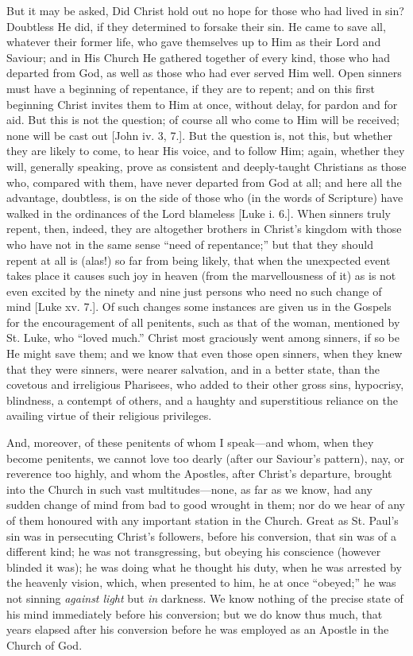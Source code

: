 But it may be asked, Did Christ hold out no hope for those who had
lived in sin? Doubtless He did, if they determined to forsake their
sin. He came to save all, whatever their former life, who gave
themselves up to Him as their Lord and Saviour; and in His Church He
gathered together of every kind, those who had departed from God, as
well as those who had ever served Him well. Open sinners must have a
beginning of repentance, if they are to repent; and on this first
beginning Christ invites them to Him at once, without delay, for
pardon and for aid. But this is not the question; of course all who
come to Him will be received; none will be cast out [John iv. 3, 7.].
But the question is, not this, but whether they are likely to come, to
hear His voice, and to follow Him; again, whether they will, generally
speaking, prove as consistent and deeply-taught Christians as those
who, compared with them, have never departed from God at all; and here
all the advantage, doubtless, is on the side of those who (in the
words of Scripture) have walked in the ordinances of the Lord
blameless [Luke i. 6.]. When sinners truly repent, then, indeed, they
are altogether brothers in Christ's kingdom with those who have not in
the same sense ``need of repentance;'' but that they should
repent at all is (alas!) so far from being likely, that when the
unexpected event takes place it causes such joy in heaven (from the
marvellousness of it) as is not even excited by the ninety and nine
just persons who need no such change of mind [Luke xv. 7.]. Of such
changes some instances are given us in the Gospels for the
encouragement of all penitents, such as that of the woman, mentioned
by St. Luke, who ``loved much.'' Christ most graciously went
among sinners, if so be He might save them; and we know that even
those open sinners, when they knew that they were sinners, were nearer
salvation, and in a better state, than the covetous and irreligious
Pharisees, who added to their other gross sins, hypocrisy, blindness,
a contempt of others, and a haughty and superstitious reliance on the
availing virtue of their religious privileges.

And, moreover, of these penitents of whom I speak—and whom, when
they become penitents, we cannot love too dearly (after our Saviour's
pattern), nay, or reverence too highly, and whom the Apostles, after
Christ's departure, brought into the Church in such vast multitudes—none,
as far as we know, had any sudden change of mind from bad to good
wrought in them; nor do we hear of any of them honoured with any
important station in the Church. Great as St. Paul's sin was in
persecuting Christ's followers, before his conversion, that sin was of
a different kind; he was not transgressing, but obeying his conscience
(however blinded it was); he was doing what he thought his duty, when
he was arrested by the heavenly vision, which, when presented to him,
he at once ``obeyed;'' he was not sinning \emph{against light}
but \emph{in} darkness. We know nothing of the precise state of his
mind immediately before his conversion; but we do know thus much, that
years elapsed after his conversion before he was employed as an
Apostle in the Church of God.


